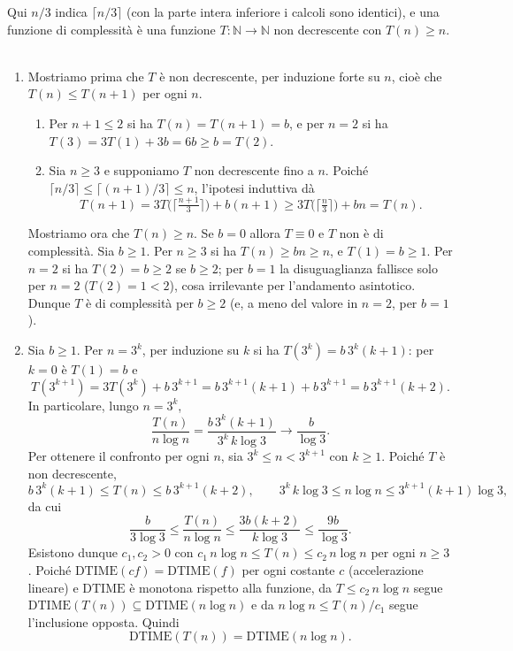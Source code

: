 \begin{sol}
Qui $n/3$ indica $\lceil n/3\rceil$ (con la parte intera inferiore i calcoli sono identici), e una funzione di complessità è una funzione $T:\mathbb N\to\mathbb N$ non decrescente con $T(n)\geq n$.
\renewcommand{\labelenumi}{\alph{enumi})}
\ 
\begin{enumerate}
\item Mostriamo prima che $T$ è non decrescente, per induzione forte su $n$, cioè che $T(n)\leq T(n+1)$ per ogni $n$.
\ 
\begin{enumerate}
\item Per $n+1\leq2$ si ha $T(n)=T(n+1)=b$, e per $n=2$ si ha $T(3)=3T(1)+3b=6b\geq b=T(2)$.
\item Sia $n\geq3$ e supponiamo $T$ non decrescente fino a $n$. Poiché $\lceil n/3\rceil\leq\lceil(n+1)/3\rceil\leq n$, l'ipotesi induttiva dà
\[
T(n+1)=3T\bigl(\lceil\tfrac{n+1}3\rceil\bigr)+b(n+1)\geq3T\bigl(\lceil\tfrac n3\rceil\bigr)+bn=T(n).
\]
\end{enumerate}
Mostriamo ora che $T(n)\geq n$. Se $b=0$ allora $T\equiv0$ e $T$ non è di complessità. Sia $b\geq1$. Per $n\geq3$ si ha $T(n)\geq bn\geq n$, e $T(1)=b\geq1$. Per $n=2$ si ha $T(2)=b\geq2$ se $b\geq2$; per $b=1$ la disuguaglianza fallisce solo per $n=2$ ($T(2)=1<2$), cosa irrilevante per l'andamento asintotico. Dunque $T$ è di complessità per $b\geq2$ (e, a meno del valore in $n=2$, per $b=1$).

\item Sia $b\geq1$. Per $n=3^k$, per induzione su $k$ si ha $T(3^k)=b\,3^k(k+1)$: per $k=0$ è $T(1)=b$ e
\[
T(3^{k+1})=3T(3^k)+b\,3^{k+1}=b\,3^{k+1}(k+1)+b\,3^{k+1}=b\,3^{k+1}(k+2).
\]
In particolare, lungo $n=3^k$,
\[
\frac{T(n)}{n\log n}=\frac{b\,3^k(k+1)}{3^k\,k\log3}\longrightarrow\frac b{\log3}.
\]
Per ottenere il confronto per ogni $n$, sia $3^k\leq n<3^{k+1}$ con $k\geq1$. Poiché $T$ è non decrescente,
\[
b\,3^k(k+1)\leq T(n)\leq b\,3^{k+1}(k+2),
\qquad
3^k\,k\log3\leq n\log n\leq3^{k+1}(k+1)\log3,
\]
da cui
\[
\frac{b}{3\log3}\leq\frac{T(n)}{n\log n}\leq\frac{3b(k+2)}{k\log3}\leq\frac{9b}{\log3}.
\]
Esistono dunque $c_1,c_2>0$ con $c_1\,n\log n\leq T(n)\leq c_2\,n\log n$ per ogni $n\geq3$. Poiché $\mathrm{DTIME}(cf)=\mathrm{DTIME}(f)$ per ogni costante $c$ (accelerazione lineare) e $\mathrm{DTIME}$ è monotona rispetto alla funzione, da $T\leq c_2\,n\log n$ segue $\mathrm{DTIME}(T(n))\subseteq\mathrm{DTIME}(n\log n)$ e da $n\log n\leq T(n)/c_1$ segue l'inclusione opposta. Quindi
\[
\mathrm{DTIME}(T(n))=\mathrm{DTIME}(n\log n).
\]
\end{enumerate}
\end{sol}
\newpage